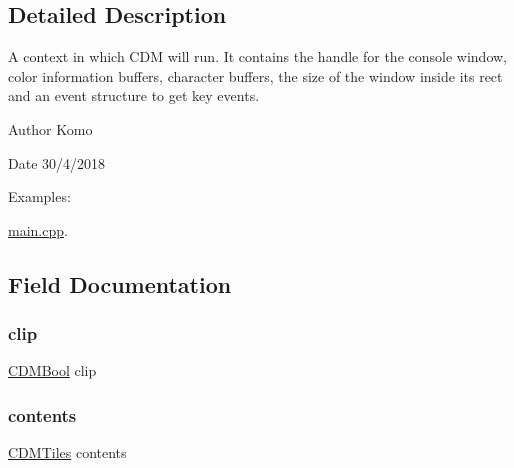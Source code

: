 \subsection{Detailed Description}
A context in which C\+DM will run. It contains the handle for the console window, color information buffers, character buffers, the size of the window inside it\textquotesingle{}s rect and an event structure to get key events. 

\begin{DoxyAuthor}{Author}
Komo 
\end{DoxyAuthor}
\begin{DoxyDate}{Date}
30/4/2018 
\end{DoxyDate}
\begin{Desc}
\item[Examples\+: ]\par
\mbox{\hyperlink{main_8cpp-example}{main.\+cpp}}.\end{Desc}


\subsection{Field Documentation}
\mbox{\label{struct_c_d_m_context_a56d929e4b8eb59ee92ecdc89fdab4141}} 
\subsubsection{\texorpdfstring{clip}{clip}}
{\footnotesize\ttfamily \mbox{\hyperlink{_c_d_m_8h_af5296d3141c193195e69417d1825228b}{C\+D\+M\+Bool}} clip}

\mbox{\label{struct_c_d_m_context_ac8c52228a53211702c5785f9c82e2f83}} 
\subsubsection{\texorpdfstring{contents}{contents}}
{\footnotesize\ttfamily \mbox{\hyperlink{struct_c_d_m_tiles}{C\+D\+M\+Tiles}} contents}

\mbox{\label{struct_c_d_m_context_ab97a0f3b9d5615487c4e542601499e94}} 
